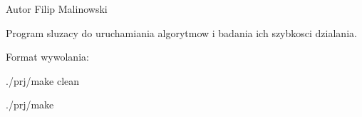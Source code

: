 \begin{DoxyAuthor}{Autor}
Filip Malinowski
\end{DoxyAuthor}
Program sluzacy do uruchamiania algorytmow i badania ich szybkosci dzialania.\par
Format wywolania\-:\par
./prj/make clean\par
./prj/make\par
